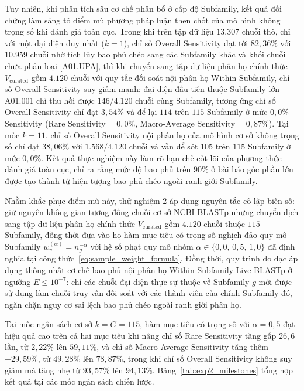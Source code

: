 Tuy nhiên, khi phân tích sâu cơ chế phân bổ ở cấp độ Subfamily, kết quả đối chứng làm sáng tỏ điểm mù phương pháp luận then chốt của mô hình không trọng số khi đánh giá toàn cục. Trong khi trên tập dữ liệu $13.307$ chuỗi thô, chỉ với một đại diện duy nhất ($k = 1$), chỉ số Overall Sensitivity đạt tới $82{,}36\%$ với $10.959$ chuỗi nhờ tích lũy bao phủ chéo sang các Subfamily khác và khối chuỗi chưa phân loại [A01.UPA], thì khi chuyển sang tập dữ liệu phân họ chính thức $V_{\text{curated}}$ gồm $4.120$ chuỗi với quy tắc đối soát nội phân họ Within-Subfamily, chỉ số Overall Sensitivity suy giảm mạnh: đại diện đầu tiên thuộc Subfamily lớn A01.001 chỉ thu hồi được $146 / 4.120$ chuỗi cùng Subfamily, tương ứng chỉ số Overall Sensitivity chỉ đạt $3{,}54\%$ và để lại $114$ trên $115$ Subfamily ở mức $0{,}0\%$ Sensitivity ($\text{Rare Sensitivity} = 0{,}0\%$, $\text{Macro-Average Sensitivity} = 0{,}87\%$). Tại mốc $k = 11$, chỉ số Overall Sensitivity nội phân họ của mô hình cơ sở không trọng số chỉ đạt $38{,}06\%$ với $1.568 / 4.120$ chuỗi và vẫn để sót $105$ trên $115$ Subfamily ở mức $0{,}0\%$. Kết quả thực nghiệm này làm rõ hạn chế cốt lõi của phương thức đánh giá toàn cục, chỉ ra rằng mức độ bao phủ trên $90\%$ ở bài báo gốc phần lớn được tạo thành từ hiện tượng bao phủ chéo ngoài ranh giới Subfamily.

\FloatBarrier
{}\label{sec:branch_2}
\label{subsec:branch2_mechanism}
\label{subsec:branch2_pareto}
\label{subsec:branch2_zero_cov}

Nhằm khắc phục điểm mù này, thử nghiệm 2 áp dụng nguyên tắc cô lập biến số: giữ nguyên không gian tương đồng chuỗi cơ sở NCBI BLASTp nhưng chuyển dịch sang tập dữ liệu phân họ chính thức $V_{\text{curated}}$ gồm $4.120$ chuỗi thuộc $115$ Subfamily, đồng thời đưa vào họ hàm mục tiêu có trọng số nghịch đảo quy mô Subfamily $w_v^{(\alpha)} = n_g^{-\alpha}$ với hệ số phạt quy mô nhóm $\alpha \in \{0{,}0, \, 0{,}5, \, 1{,}0\}$ đã định nghĩa tại công thức~\eqref{eq:sample_weight_formula}. Đồng thời, quy trình đo đạc áp dụng thống nhất cơ chế bao phủ nội phân họ Within-Subfamily Live BLASTp ở ngưỡng $E \le 10^{-7}$: chỉ các chuỗi đại diện thực sự thuộc về Subfamily $g$ mới được sử dụng làm chuỗi truy vấn đối soát với các thành viên của chính Subfamily đó, ngăn chặn nguy cơ sai lệch bao phủ chéo ngoài ranh giới phân họ.

Tại mốc ngân sách cơ sở $k = G = 115$, hàm mục tiêu có trọng số với $\alpha = 0{,}5$ đạt hiệu quả cao trên cả hai mục tiêu khi nâng chỉ số Rare Sensitivity tăng gấp $26{,}6$ lần, từ $2{,}22\%$ lên $59{,}11\%$, và chỉ số Macro-Average Sensitivity tăng thêm $+29{,}59\%$, từ $49{,}28\%$ lên $78{,}87\%$, trong khi chỉ số Overall Sensitivity không suy giảm mà tăng nhẹ từ $93{,}57\%$ lên $94{,}13\%$. Bảng~\ref{tab:exp2_milestones} tổng hợp kết quả tại các mốc ngân sách chiến lược.

